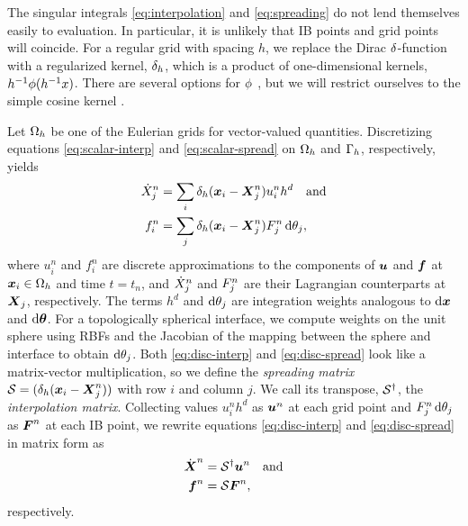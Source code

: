 The singular integrals \eqref{eq:interpolation} and \eqref{eq:spreading} do not lend
themselves easily to evaluation. In particular, it is unlikely that IB points and grid
points will coincide. For a regular grid with spacing $h$, we replace the Dirac
$\delta$-function with a regularized kernel, $\delta_h$, which is a product of
one-dimensional kernels, $h^{-1}\phi(h^{-1}x)$. There are several options for
$\phi$ \cite{Griffith:2020hi}, but we will restrict ourselves to the simple cosine
kernel \cite{Peskin:2002go}.

Let $\Omega_h$ be one of the Eulerian grids for vector-valued quantities. Discretizing
equations \eqref{eq:scalar-interp} and \eqref{eq:scalar-spread} on $\Omega_h$ and
$\Gamma_h$, respectively, yields
\begin{align}
    \label{eq:disc-interp}
    \dot{X}^n_j &= \sum_i \delta_h(\x_i-\X^n_j)u^n_i h^d \quad \text{and} \\
    \label{eq:disc-spread}
    f^n_i &= \sum_j \delta_h(\x_i-\X^n_j)F^n_j \d\theta_j,
\end{align}
where $u^n_i$ and $f^n_i$ are discrete approximations to the components of $\boldsymbol{u}$ and $\boldsymbol{f}$
at $\boldsymbol{x}_i\in\Omega_h$ and time $t=t_n$, and $\dot{X}^n_{\smash j}$ and $F^n_{\smash j}$
are their Lagrangian counterparts at $\boldsymbol{X}_{\smash j}$, respectively. The terms $h^d$ and
$\d\theta_{\smash j}$ are integration weights analogous to $\d\x$ and $\d\params$. For
a topologically spherical interface, we compute weights on the unit sphere using RBFs
\cite{Fuselier:2013coba} and the Jacobian of the mapping between the sphere and interface
to obtain $\d\theta_{\smash j}$. Both \eqref{eq:disc-interp} and \eqref{eq:disc-spread}
look like a matrix-vector multiplication, so we define the \emph{spreading matrix}
$\mathcal{S}=(\delta_h(\boldsymbol{x}_i-\boldsymbol{X}^n_{\smash j}))$ with row $i$ and column $j$. We call its
transpose, $\mathcal{S}^\dagger$, the \emph{interpolation matrix}. Collecting values $u^n_ih^d$ as
$\boldsymbol{u}^n$ at each grid point and $F^n_{\smash j}\d\theta_{\smash j}$ as $\boldsymbol{F}^n$ at each IB
point, we rewrite equations \eqref{eq:disc-interp} and \eqref{eq:disc-spread} in matrix
form as
\begin{align}
    \label{eq:matrix-interp}
    \dot{\boldsymbol{X}}^n &= \mathcal{S}^\dagger\boldsymbol{u}^n \quad\text{and} \\
    \label{eq:matrix-spread}
    \boldsymbol{f}^n &= \mathcal{S}\boldsymbol{F}^n,
\end{align}
respectively.

